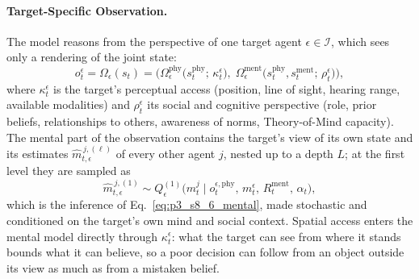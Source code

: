 \paragraph{Target-Specific Observation.}
The model reasons from the perspective of one target agent $\epsilon\in\mathcal{I}$, which sees only a rendering of the joint state:
\begin{equation}
\label{eq:p3_s8_6_mwm_obs}
o_t^{\epsilon} = \Omega_{\epsilon}(s_t) = \Big(\Omega_{\epsilon}^{\mathrm{phy}}\big(s_t^{\mathrm{phy}};\, \kappa_t^{\epsilon}\big),\; \Omega_{\epsilon}^{\mathrm{ment}}\big(s_t^{\mathrm{phy}}, s_t^{\mathrm{ment}};\, \rho_t^{\epsilon}\big)\Big),
\end{equation}
where $\kappa_t^{\epsilon}$ is the target's perceptual access (position, line of sight, hearing range, available modalities) and $\rho_t^{\epsilon}$ its social and cognitive perspective (role, prior beliefs, relationships to others, awareness of norms, Theory-of-Mind capacity). The mental part of the observation contains the target's view of its own state and its estimates $\widehat{m}^{\,j,(\ell)}_{t,\epsilon}$ of every other agent $j$, nested up to a depth $L$; at the first level they are sampled as
\begin{equation}
\label{eq:p3_s8_6_mwm_tom}
\widehat{m}^{\,j,(1)}_{t,\epsilon} \sim Q^{(1)}_{\epsilon}\big(m_t^{j} \mid o_t^{\epsilon,\mathrm{phy}},\, m_t^{\epsilon},\, R_t^{\mathrm{ment}},\, \alpha_t\big),
\end{equation}
which is the inference of Eq.~\eqref{eq:p3_s8_6_mental}, made stochastic and conditioned on the target's own mind and social context. Spatial access enters the mental model directly through $\kappa_t^{\epsilon}$: what the target can see from where it stands bounds what it can believe, so a poor decision can follow from an object outside its view as much as from a mistaken belief.

